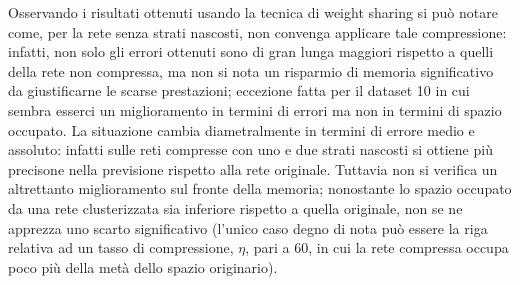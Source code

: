 \documentclass[12pt]{report}
\begin{document}
\par\null\par
\par\null\par
\par\null\par



\par\null\par
\par\null\par

Osservando i risultati ottenuti usando la tecnica di weight sharing si può notare come, per la rete senza strati nascosti, non convenga applicare tale compressione: infatti, non solo gli errori ottenuti sono di gran lunga maggiori rispetto a quelli della rete non compressa, ma non si nota un risparmio di memoria significativo da giustificarne le scarse prestazioni; eccezione fatta per il dataset 10 in cui sembra esserci un miglioramento in termini di errori ma non in termini di spazio occupato. La situazione cambia diametralmente in termini di errore medio e assoluto: infatti sulle reti compresse con uno e due strati nascosti si ottiene più precisone nella previsione rispetto alla rete originale. Tuttavia non si verifica un altrettanto miglioramento sul fronte della memoria; nonostante lo spazio occupato da una rete clusterizzata sia inferiore rispetto a quella originale, non se ne apprezza uno scarto significativo (l'unico caso degno di nota può essere la riga relativa ad un tasso di compressione, $\eta$, pari a 60, in cui la rete compressa occupa poco più della metà dello spazio originario).
\end{document}
